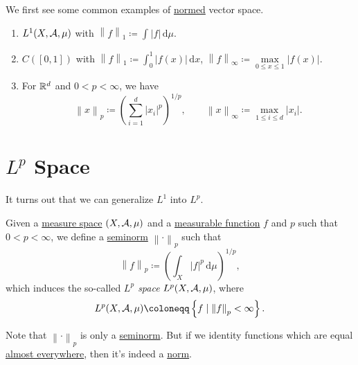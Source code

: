 \begin{eg}
	We first see some common examples of \hyperref[def:norm]{normed} vector space.
	\begin{enumerate}[(1)]
		\item \(L^1(X, \mathcal{\MakeUppercase{a}}  , \mu )\) with \(\left\lVert f\right\rVert _1 \coloneqq \int_{}^{} \left\vert f \right\vert  \,\mathrm{d}\mu  \).
		\item \(C([0, 1])\) with \(\left\lVert f\right\rVert _1 \coloneqq \int_{0}^{1} \left\vert f(x) \right\vert  \,\mathrm{d}x \), \(\left\lVert f\right\rVert _\infty \coloneqq \mathop{\max}\limits_{0\leq x\leq 1}\left\vert f(x) \right\vert \).
		\item For \(\mathbb{\MakeUppercase{r}} ^d\) and \(0 < p < \infty \), we have
		      \[
			      \left\lVert x\right\rVert _p \coloneqq \left(\sum\limits_{i=1}^{d} \left\vert x_{i}  \right\vert^p \right)^{1/p},\qquad \left\lVert x\right\rVert _\infty \coloneqq \mathop{\max} _{1\leq i\leq d}\left\vert x_{i}  \right\vert.
		      \]
	\end{enumerate}
\end{eg}

\section{\(L^{p} \) Space}
It turns out that we can generalize \hyperref[def:L1-space]{\(L^1\)} into \(L^p\).
\begin{definition}[\(L^p\) space]\label{def:L-p-space}
	Given a \hyperref[def:measure-space]{measure space} \((X, \mathcal{\MakeUppercase{a}} , \mu )\) and a \hyperref[def:measurable-function]{measurable function} \(f\) and \(p\) such that
	\(0 < p < \infty \), we define a \hyperref[def:seminorm]{seminorm} \(\left\lVert \cdot\right\rVert _p\) such that
	\[
		\left\lVert f\right\rVert _p \coloneqq \left(\int _X \left\vert f \right\vert ^p \,\mathrm{d} \mu \right)^{1/p},
	\]
	which induces the so-called \emph{\(L^p\) space} \(L^p(X, \mathcal{\MakeUppercase{a}} , \mu )\), where
	\[
		L^p(X, \mathcal{\MakeUppercase{a}} , \mu ) \coloneqq \left\{f\mid \left\lVert f\right\rVert _p < \infty \right\}.
	\]
\end{definition}
\begin{remark}
	Note that \(\left\lVert \cdot\right\rVert _p\) is only a \hyperref[def:seminorm]{seminorm}. But if we identity functions which are equal \hyperref[def:mu-almost-everywhere]{almost everywhere},
	then it's indeed a \hyperref[def:norm]{norm}.
\end{remark}

